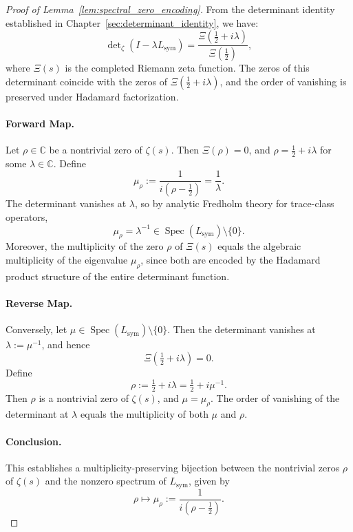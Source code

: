 \begin{proof}[Proof of Lemma~\ref{lem:spectral_zero_encoding}]
From the determinant identity established in Chapter~\ref{sec:determinant_identity}, we have:
\[
\det\nolimits_{\zeta}(I - \lambda L_{\mathrm{sym}}) = \frac{\Xi\left( \tfrac{1}{2} + i\lambda \right)}{\Xi\left( \tfrac{1}{2} \right)},
\]
where \( \Xi(s) \) is the completed Riemann zeta function. The zeros of this determinant coincide with the zeros of \( \Xi(\tfrac{1}{2} + i\lambda) \), and the order of vanishing is preserved under Hadamard factorization.

\paragraph{Forward Map.}
Let \( \rho \in \mathbb{C} \) be a nontrivial zero of \( \zeta(s) \). Then \( \Xi(\rho) = 0 \), and \( \rho = \tfrac{1}{2} + i\lambda \) for some \( \lambda \in \mathbb{C} \). Define
\[
\mu_\rho := \frac{1}{i(\rho - \tfrac{1}{2})} = \frac{1}{\lambda}.
\]
The determinant vanishes at \( \lambda \), so by analytic Fredholm theory for trace-class operators,
\[
\mu_\rho = \lambda^{-1} \in \operatorname{Spec}(L_{\mathrm{sym}}) \setminus \{0\}.
\]
Moreover, the multiplicity of the zero \( \rho \) of \( \Xi(s) \) equals the algebraic multiplicity of the eigenvalue \( \mu_\rho \), since both are encoded by the Hadamard product structure of the entire determinant function.

\paragraph{Reverse Map.}
Conversely, let \( \mu \in \operatorname{Spec}(L_{\mathrm{sym}}) \setminus \{0\} \). Then the determinant vanishes at \( \lambda := \mu^{-1} \), and hence
\[
\Xi\left(\tfrac{1}{2} + i\lambda\right) = 0.
\]
Define
\[
\rho := \tfrac{1}{2} + i\lambda = \tfrac{1}{2} + i\mu^{-1}.
\]
Then \( \rho \) is a nontrivial zero of \( \zeta(s) \), and \( \mu = \mu_\rho \). The order of vanishing of the determinant at \( \lambda \) equals the multiplicity of both \( \mu \) and \( \rho \).

\paragraph{Conclusion.}
This establishes a multiplicity-preserving bijection between the nontrivial zeros \( \rho \) of \( \zeta(s) \) and the nonzero spectrum of \( L_{\mathrm{sym}} \), given by
\[
\rho \mapsto \mu_\rho := \frac{1}{i(\rho - \tfrac{1}{2})}.
\]
\end{proof}
